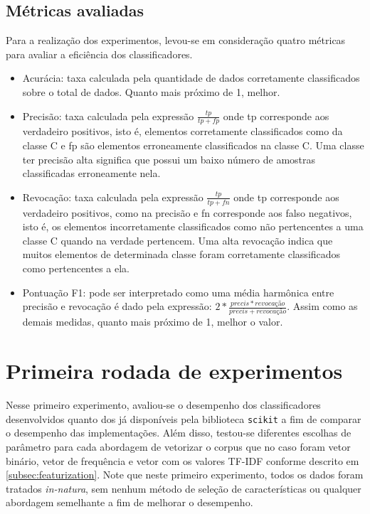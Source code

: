 \subsection{Métricas avaliadas}
\label{subsec:metrics}

Para a realização dos experimentos, levou-se em consideração quatro métricas
para avaliar a eficiência dos classificadores.

\begin{itemize}
	\item Acurácia: taxa calculada pela quantidade de dados corretamente classificados
	sobre o total de dados. Quanto mais próximo de 1, melhor.
	\item Precisão: taxa calculada pela expressão $\frac{tp}{tp + fp}$ onde tp corresponde
	aos verdadeiro positivos, isto é, elementos corretamente classificados como da classe C
	e fp são elementos erroneamente classificados na classe C. Uma classe ter precisão alta
	significa que possui um baixo número de amostras classificadas erroneamente nela.
	\item Revocação: taxa calculada pela expressão $\frac{tp}{tp + fn}$ onde tp corresponde
	aos verdadeiro positivos, como na precisão e fn corresponde
	aos falso negativos, isto é, os elementos incorretamente classificados como não pertencentes
	a uma classe C quando na verdade pertencem. Uma alta revocação indica que muitos elementos
	de determinada classe foram corretamente classificados como pertencentes a ela.
	\item Pontuação F1: pode ser interpretado como uma média harmônica entre precisão e revocação é dado
	pela expressão: $2*\frac{precis*revocação}{precis + revocação}$. Assim como as demais medidas, quanto
	mais próximo de 1, melhor o valor.
\end{itemize}

\section{Primeira rodada de experimentos}
\label{sec:first_experiments}

Nesse primeiro experimento, avaliou-se o desempenho dos classificadores desenvolvidos quanto dos
já disponíveis pela biblioteca \texttt{scikit} a fim de comparar o desempenho das implementações.
Além disso, testou-se diferentes escolhas de parâmetro para cada abordagem de vetorizar o corpus
que no caso foram vetor binário, vetor de frequência e vetor com os valores TF-IDF conforme descrito
em \ref{subsec:featurization}. 
Note que neste primeiro experimento, todos os dados foram tratados \textit{in-natura}, sem nenhum método de seleção de características ou qualquer abordagem semelhante a fim de melhorar o desempenho.

